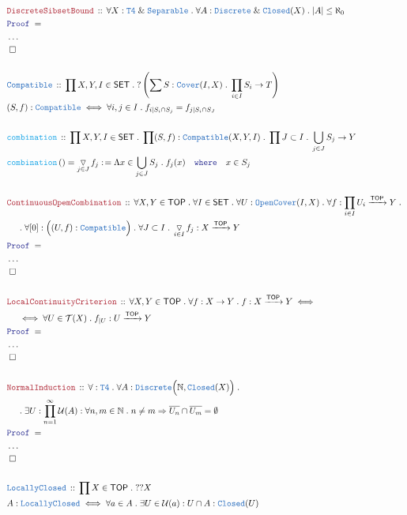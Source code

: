 \documentclass[12pt]{scrartcl}
\newcommand{\TYPE}[1]{\textcolor{NavyBlue}{\mathtt{#1}}}
\newcommand{\FUNC}[1]{\textcolor{Cerulean}{\mathtt{#1}}}
\newcommand{\LOGIC}[1]{\textcolor{Blue}{\mathtt{#1}}}
\newcommand{\THM}[1]{\textcolor{Maroon}{\mathtt{#1}}}
\renewcommand{\.}{\; . \;}
\newcommand{\de}{: \kern 0.1pc =}
\newcommand{\where}{\LOGIC{where}}
\newcommand{\Act}[1]{\left( #1 \right)}
\newcommand{\Theorem}[2]{& \THM{#1} \, :: \, #2 \\ & \Proof = \\ }
\newcommand{\DeclareType}[2]{& \TYPE{#1} \, :: \, #2 \\}
\newcommand{\DefineType}[3]{& #1 : \TYPE{#2} \iff #3 \\}
\newcommand{\DeclareFunc}[2]{& \FUNC{#1} \, :: \, #2 \\}
\newcommand{\DefineNamedFunc}[4]{&  \FUNC{#1}\Act{#2} = #3 \de #4 \\}
\newcommand{\NewLine}{\\ & \kern 1pc}
\newcommand{\Page}[1]{ \begin{align*} #1 \end{align*}   }
\newcommand{\NoProof}{ & \ldots \\ \EndProof}
\renewcommand{\And}{\; \& \;}
\newcommand{\Imply}{\Rightarrow}
\newcommand{\Nat}{\mathbb{N} }
\newcommand{\Arrow}{\xrightarrow}
\newcommand{\QED}{\; \square}
\newcommand{\EndProof}{& \QED \\}
\newcommand{\Proof}{\LOGIC{Proof} \; }
\newcommand{\SET}{\mathsf{SET}}
\DeclareMathOperator{\combo}{\triangledown}
\newcommand{\TOP}{\mathsf{TOP}}
\newcommand{\T}{\mathcal{T}}
\newcommand{\U}{\mathcal{U}}
\begin{document}
\Page{
	\Theorem{DiscreteSibsetBound}
	{
		\forall X : \TYPE{T4} \And \TYPE{Separable} \.
		\forall A : \TYPE{Discrete} \And \TYPE{Closed}(X) \. 
		|A| \le \aleph_0
	}
	\NoProof
	\\
	\DeclareType{Compatible}{ \prod X,Y,I \in \SET \. ?\left( \sum S : \TYPE{Cover}(I,X) \. \prod_{i \in I} S_i \to T\right) }
	\DefineType{(S,f)}{Compatible}{\forall i,j \in I \. f_{i|S_i \cap S_j} = f_{j|S_i \cap S_J}}
	\\
	\DeclareFunc{combination}{
		\prod X,Y,I \in \SET \. 
		\prod (S,f) : \TYPE{Compatible}(X,Y,I) \. 
		\prod J \subset I \. \bigcup_{j \in J} S_j \to Y 
	}
	\DefineNamedFunc{combination}{}{\combo_{j \in J} f_j}{\Lambda x \in \bigcup_{j \in J} S_j \. f_j(x) 
		\quad  \where \quad x \in S_j} 
	\\
	\Theorem{ContinuousOpemCombination}
	{
		\forall X,Y \in \TOP \. \forall I \in \SET \.
		\forall U : \TYPE{OpenCover}(I,X) \. 
		\forall f : \prod_{i \in I}  U_i \Arrow{\TOP} Y \. \NewLine \. 
		\forall [0] : \Big( (U,f) : \TYPE{Compatible}  \Big) \.
		\forall J \subset I \. 
		\combo_{i \in I} f_j : X \Arrow{\TOP} Y
	}
	\NoProof
	\\
	\Theorem{LocalContinuityCriterion}
	{
		\forall X,Y \in \TOP \.
		\forall f : X \to Y \.
		f : X \Arrow{\TOP} Y 
		\iff \NewLine \iff 
		\forall U \in \T(X) \.
		f_{|U} : U \Arrow{\TOP} Y
	}
	\NoProof
	\\
	\Theorem{NormalInduction}
	{
		\forall : \TYPE{T4} \.
		\forall A : \TYPE{Discrete}\Big(\Nat, \TYPE{Closed}(X) \Big) \. \NewLine \.
		\exists U :\prod^\infty_{n = 1} \U(A) :
		\forall n,m \in \Nat \. n \neq m \Imply \overline{U_n} \cap \overline{U_m} = \emptyset
	}
	\NoProof
	\\
	\DeclareType{LocallyClosed}{ \prod X \in \TOP \. ??X}
	\DefineType{A}{LocallyClosed}{\forall a \in A \. \exists U \in \U(a) : U \cap A : \TYPE{Closed}(U) }
}
\end{document}
